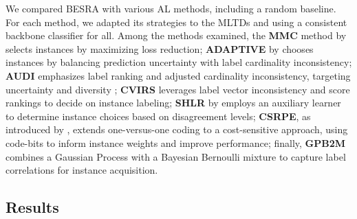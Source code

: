 \documentclass[letterpaper]{article} %
\begin{document}
We compared BESRA with various AL methods, including a random baseline.
For each method, we adapted its strategies to the MLTDs and using a consistent backbone classifier for all.
Among the methods examined, the \textbf{MMC} method by \citet{mmc2009} selects instances by maximizing loss reduction; \textbf{ADAPTIVE} by \citet{adaptive2013} chooses instances by balancing prediction uncertainty with label cardinality inconsistency; \textbf{AUDI} emphasizes label ranking and adjusted cardinality inconsistency, targeting uncertainty and diversity \cite{6729601}; \textbf{CVIRS} \cite{REYES2018494} leverages label vector inconsistency and score rankings to decide on instance labeling; \textbf{SHLR} by \citet{pmlr-v20-hung11} employs an auxiliary learner to determine instance choices based on disagreement levels; \textbf{CSRPE}, as introduced by \citet{10.1007/978-3-319-93034-3_12}, extends one-versus-one coding to a cost-sensitive approach, using code-bits to inform instance weights and improve performance; finally, \textbf{GPB2M} \cite{gaupb2_2021} combines a Gaussian Process with a Bayesian Bernoulli mixture to capture label correlations for instance acquisition.







\subsection{Results}
\end{document}
